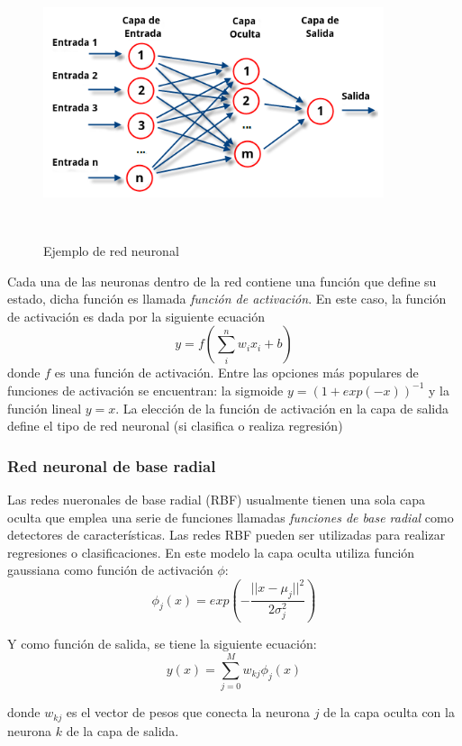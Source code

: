 {\begin{figure}[H]
  \centering
      \includegraphics[width=10cm,height=8cm]{figures/NeuralNetwork.png} 
  \caption{Ejemplo de red neuronal}
\end{figure}

Cada una de las neuronas dentro de la red contiene una función que define su estado, dicha función es llamada \emph{función de activación}. En este caso, la función de activación es dada por la siguiente ecuación $$y=f(\sum_{i}^{n} w_ix_i+b)$$ donde $f$ es una función de activación. Entre las opciones más populares de funciones de activación se encuentran: la sigmoide $y = (1+exp(-x))^{-1}$ y la función lineal $y=x$. La elección de la función de activación en la capa de salida define el tipo de red neuronal (si clasifica o realiza regresión)

\subsubsection*{Red neuronal de base radial}

Las redes nueronales de base radial (RBF) usualmente tienen una sola capa oculta que emplea una serie de funciones llamadas \emph{funciones de base radial} como detectores de características. Las redes RBF pueden ser utilizadas para realizar regresiones o clasificaciones. En este modelo la capa oculta utiliza función gaussiana como función de activación $\phi$: $$\phi_j(x)=exp(-\frac{||x-\mu_j||^2}{2\sigma_j^2})$$

Y como función de salida, se tiene la siguiente ecuación: $$y(x)=\sum_{j=0}^{M} w_{kj} \phi_j(x)$$

donde $w_{kj}$ es el vector de pesos que conecta la neurona $j$ de la capa oculta con la neurona $k$ de la capa de salida.

}
